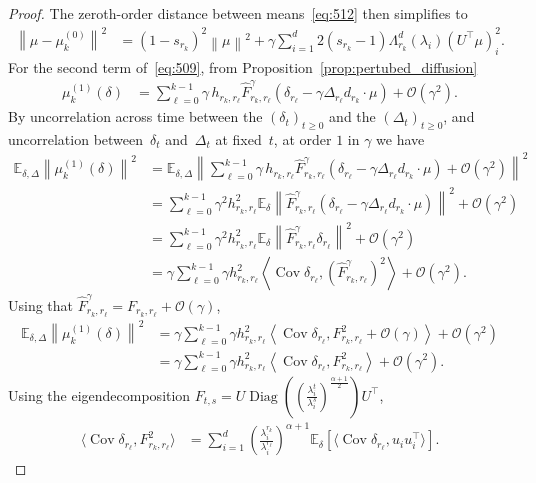 \documentclass[11pt]{article}
\newcommand{\norm}[1]{\left\|{#1}\right\|}
\newcommand{\EE}{\mathbb{E}}
\newcommand{\cov}{\operatorname{Cov}}
\newcommand{\diag}[1]{\operatorname{Diag}\left({#1}\right)}
\begin{document}
\begin{proof}
The zeroth-order distance between means~\eqref{eq:512} then simplifies to 
\begin{align*}
\norm{\mu - \mu_k^{(0)}}^2 &= (1- s_{r_k})^2 \norm{\mu}^2 + \gamma \sum_{i=1}^d 2 (s_{r_k}-1) \Lambda^{d}_{r_k}(\lambda_i)(U^\top \mu)^2_i. 
\end{align*} 
For the second term of~\eqref{eq:509}, from Proposition~\ref{prop:pertubed_diffusion}
\begin{align*}
    \mu_k^{(1)}(\delta) &=  \sum_{\ell=0}^{k-1} \gamma \, h_{r_k,r_\ell} \hat F^\gamma_{r_k, r_\ell} (\delta_{r_\ell} - \gamma \Delta_{r_\ell}d_{r_k} \cdot \mu) + \mathcal{O}(\gamma^2)  .
\end{align*}
By uncorrelation across time between the $(\delta_t)_{t\geq 0}$ and the $(\Delta_t)_{t\geq 0}$, and uncorrelation between~$\delta_t$ and~$\Delta_t$ at fixed~$t$, at order $1$ in $\gamma$ we have 
\begin{align*}
\EE_{\delta, \Delta} \norm{\mu_k^{(1)}(\delta)}^2 
&= \EE_{\delta, \Delta} \norm{ \sum_{\ell=0}^{k-1} \gamma \, h_{r_k,r_\ell} \hat F^\gamma_{r_k, r_\ell} (\delta_{r_\ell} - \gamma \Delta_{r_\ell}d_{r_k} \cdot \mu) + \mathcal{O}(\gamma^2)  }^2  \\
&= \sum_{\ell=0}^{k-1} \gamma^2  h_{r_k,r_\ell}^2 \EE_{\delta} \norm{ \hat F^\gamma_{r_k, r_\ell} (\delta_{r_\ell} - \gamma \Delta_{r_\ell}d_{r_k} \cdot \mu)}^2 + \mathcal{O}(\gamma^2) \\
&= \sum_{\ell=0}^{k-1} \gamma^2  h_{r_k,r_\ell}^2 \EE_{\delta} \norm{ \hat F^\gamma_{r_k, r_\ell} \delta_{r_\ell}}^2 + \mathcal{O}(\gamma^2) \\
&= \gamma \sum_{\ell=0}^{k-1} \gamma h_{r_k,r_\ell}^2 \left\langle \cov \delta_{r_\ell},  \left(\hat F^\gamma_{r_k,r_\ell}\right)^2 \right\rangle + \mathcal{O}(\gamma^2).
\end{align*}
Using that $\hat F^\gamma_{r_k,r_\ell} = F_{r_k,r_\ell} + \mathcal{O}(\gamma)$,
\begin{align*}
\EE_{\delta, \Delta} \norm{\mu_k^{(1)}(\delta)}^2  &= \gamma \sum_{\ell=0}^{k-1} \gamma h_{r_k,r_\ell}^2 \left\langle \cov \delta_{r_\ell},   F_{r_k,r_\ell}^2 + \mathcal{O}(\gamma) \right\rangle + \mathcal{O}(\gamma^2) \\
&= \gamma \sum_{\ell=0}^{k-1} \gamma h_{r_k,r_\ell}^2 \left\langle \cov \delta_{r_\ell},   F_{r_k,r_\ell}^2 \right\rangle + \mathcal{O}(\gamma^2).
\end{align*}
Using the eigendecomposition $F_{t,s} = U \diag{\left(\frac{\lambda_i^t}{\lambda_i^s}\right)^{\frac{\alpha+1}{2}}} U^\top $, 
\begin{align*}
\langle \cov \delta_{r_\ell}, F_{r_k,r_\ell}^2 \rangle
&= \sum_{i=1}^d\left(\frac{\lambda_i^{r_k}}{\lambda_i^{r_\ell}}\right)^{\alpha+1} \EE_{\delta} \left[\langle \cov \delta_{r_\ell}, u_i u_i^\top \rangle\right] .
\end{align*}


\end{proof}
\end{document}

